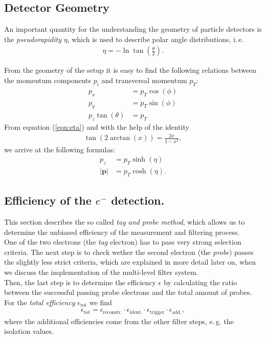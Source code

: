 \documentclass[twocolumn,
			   showpacs,%
               nofootinbib,
               aps,%
               prd,
               notitlepage,
               showkeys,
               10pt]{revtex4-1}
\begin{document}
\subsection{Detector Geometry}
An important quantity for the understanding the geometry of particle detectors is the \textit{pseudorapidity} $\eta$, which is used to describe polar angle distributions, i.\,e.
\begin{align}
\eta = -\ln \tan(\frac{\theta}{2}).	\label{eqn:eta}
\end{align}

From the geometry of the setup it is easy to find the following relations between the momentum components $p_i$ and transversal momentum $p_T$:
\begin{align}
	p_x &= p_T \cos(\phi)\\
	p_y &= p_T \sin(\phi)\\
	p_z \tan(\theta) &= p_T
\end{align}
From equation (\ref{eqn:eta}) and with the help of the identity
\begin{align*}
\tan(2\arctan(x)) = \frac{2x}{1 - x^2},
\end{align*} 
we arrive at the following formulas:
\begin{align}
	p_z &= p_T\sinh(\eta)\\
	\left|\mathbf{p}\right| &= p_T \cosh(\eta).
\end{align}


\subsection{Efficiency of the $e^-$ detection.}
This section describes the so called \textit{tag and probe method}, which allows us to determine the unbiased efficiency of the measurement and filtering process.\\
One of the two electrons (the \textit{tag} electron) has to pass very strong selection criteria. The next step is to check wether the second electron (the \textit{probe}) passes the slightly less strict criteria, which are explained in more detail later on, when we discuss the implementation of the multi-level filter system. \\
Then, the last step is to determine the efficiency $\epsilon$ by calculating the ratio between the successful passing probe electrons and the total amount of probes.\\
For the \textit{total efficiency} $\epsilon_{\text{tot}}$ we find 
\begin{align}
	\epsilon_{\text{tot}} = \epsilon_{\text{reconstr.}} \cdot \epsilon_{\text{ident.}} \cdot \epsilon_{\text{trigger}} \cdot \epsilon_{\text{add.}},
\end{align}
 where the additional efficiencies come from the other filter steps, e.\,g. the isolation values. \\
 
\end{document}
